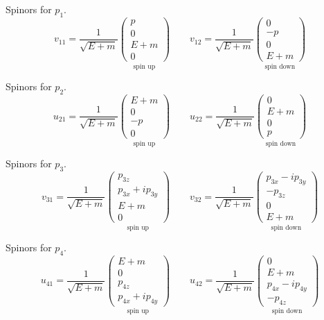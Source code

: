 Spinors for $p_1$.
\begin{equation*}
v_{11}=\frac{1}{\sqrt{E+m}}
\underset{\text{spin up}}
{\begin{pmatrix}p\\0\\E+m\\0\end{pmatrix}}
\qquad
v_{12}=\frac{1}{\sqrt{E+m}}
\underset{\text{spin down}}
{\begin{pmatrix}0\\-p\\0\\E+m\end{pmatrix}}
\end{equation*}

Spinors for $p_2$.
\begin{equation*}
u_{21}=\frac{1}{\sqrt{E+m}}
\underset{\text{spin up}}
{\begin{pmatrix}E+m\\0\\-p\\0\end{pmatrix}}
\qquad
u_{22}=\frac{1}{\sqrt{E+m}}
\underset{\text{spin down}}
{\begin{pmatrix}0\\E+m\\0\\p\end{pmatrix}}
\end{equation*}

Spinors for $p_3$.
\begin{equation*}
v_{31}=\frac{1}{\sqrt{E+m}}
\underset{\text{spin up}}
{\begin{pmatrix}p_{3z}\\p_{3x}+ip_{3y}\\E+m\\0\end{pmatrix}}
\qquad
v_{32}=\frac{1}{\sqrt{E+m}}
\underset{\text{spin down}}
{\begin{pmatrix}p_{3x}-ip_{3y}\\-p_{3z}\\0\\E+m\end{pmatrix}}
\end{equation*}

Spinors for $p_4$.
\begin{equation*}
u_{41}=\frac{1}{\sqrt{E+m}}
\underset{\text{spin up}}
{\begin{pmatrix}E+m\\0\\p_{4z}\\p_{4x}+ip_{4y}\end{pmatrix}}
\qquad
u_{42}=\frac{1}{\sqrt{E+m}}
\underset{\text{spin down}}
{\begin{pmatrix}0\\E+m\\p_{4x}-ip_{4y}\\-p_{4z}\end{pmatrix}}
\end{equation*}

